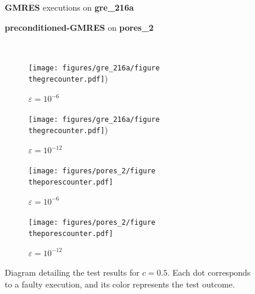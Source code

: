\documentclass[twoside]{article}
\newcounter{fig}\setcounter{fig}{0}
\begin{document}
  \begin{figure}[H]
    \centering
    
    \begin{minipage}[b]{0.45\linewidth}
      \centering
      \textbf{GMRES} executions on \textbf{gre_216a} 
    \end{minipage}
    \quad
    \begin{minipage}{0.45\linewidth}
      \centering
      \textbf{preconditioned-GMRES} on \textbf{pores_2}
    \end{minipage}\\


    \begin{minipage}[b]{0.48\linewidth}
      
      \begin{subfigure}[t]{\linewidth}
        \centering
        \texttt{[image: figures/gre\_216a/figure\\thegrecounter.pdf]})
        \caption{$\varepsilon = 10^{-6}$}\label{fig:gre_216a_test_result_c05_0}	
      \end{subfigure}
      \quad
      \begin{subfigure}[t]{\linewidth}
        \centering
        \texttt{[image: figures/gre\_216a/figure\\thegrecounter.pdf]})
        \caption{$\varepsilon = 10^{-12}$}\label{fig:gre_216a_test_result_c05_1}	
      \end{subfigure}
    \end{minipage}
    \quad
    \begin{minipage}[b]{0.48\linewidth}
      
      \begin{subfigure}[t]{\linewidth}
        \centering
        \texttt{[image: figures/pores\_2/figure\\theporescounter.pdf]}

        \caption{$\varepsilon = 10^{-6}$}\label{fig:pores_2_test_result_c05_0}	
      \end{subfigure}
      \quad
      \begin{subfigure}[t]{\linewidth}
        \centering
        \texttt{[image: figures/pores\_2/figure\\theporescounter.pdf]}
        
        \caption{$\varepsilon = 10^{-12}$}\label{fig:pores_2_test_result_c05_1}	
      \end{subfigure}

    \end{minipage}
    \caption{Diagram detailing the test results for $c = 0.5$. Each dot corresponds to a faulty execution, and its color represents the test outcome.}
    \label{fig:test_result_c05}
  \end{figure}
\end{document}
